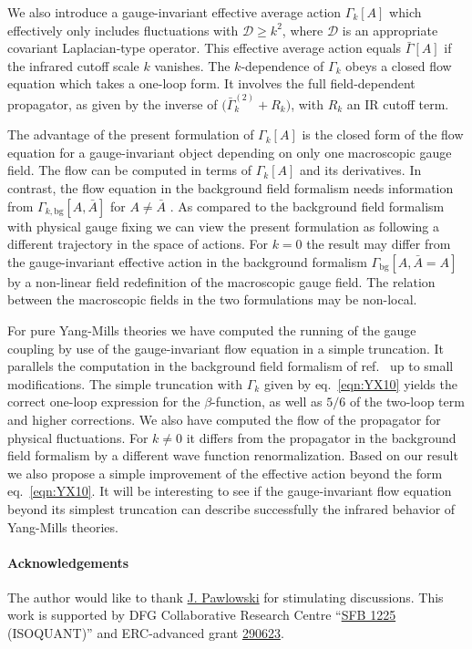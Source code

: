 \documentclass[twocolumn,aps,prd,amsmath,amssymb,preprintnumbers,longbibliography]{revtex4-1}
\numberwithin{equation}{section}
\begin{document}
We also introduce a gauge-invariant effective average action $\Gamma_k[A]$ which effectively only includes fluctuations with $\mathcal{D} \geq k^2$, where $\mathcal{D}$ is an appropriate covariant Laplacian-type operator. This effective average action equals $\bar\Gamma[A]$ if the infrared cutoff scale $k$ vanishes. The $k$-dependence of $\Gamma_k$ obeys a closed flow equation which takes a one-loop form. It involves the full field-dependent propagator, as given by the inverse of $\bigl(\bar\Gamma_k^{(2)} + R_k\bigr)$, with $R_k$ an IR cutoff term. 

The advantage of the present formulation of $\Gamma_k[A]$ is the closed form of the flow equation for a gauge-invariant object depending on only one macroscopic gauge field. The flow can be computed in terms of $\Gamma_k[A]$ and its derivatives. In contrast, the flow equation in the background field formalism needs information from $\Gamma_{k,\text{bg}}[A,\bar{A}]$ for $A \neq \bar{A}$ \cite{RW}. As compared to the background field formalism with physical gauge fixing we can view the present formulation as following a different trajectory in the space of actions. For $k = 0$ the result may differ from the gauge-invariant effective action in the background formalism $\Gamma_\text{bg}[A,\bar{A} = A]$ by a non-linear field redefinition of the macroscopic gauge field. The relation between the macroscopic fields in the two formulations may be non-local.

For pure Yang-Mills theories we have computed the running of the gauge coupling by use of the gauge-invariant flow equation in a simple truncation. It parallels the computation in the background field formalism of ref.~\cite{RW} up to small modifications. The simple truncation with $\Gamma_k$ given by eq.~\eqref{eqn:YX10} yields the correct one-loop expression for the $\beta$-function, as well as $5/6$ of the two-loop term and higher corrections. We also have computed the flow of the propagator for physical fluctuations. For $k \neq 0$ it differs from the propagator in the background field formalism by a different wave function renormalization. Based on our result we also propose a simple improvement of the effective action beyond the form eq.~\eqref{eqn:YX10}. It will be interesting to see if the gauge-invariant flow equation beyond its simplest truncation can describe successfully the infrared behavior of Yang-Mills theories.

\paragraph{Acknowledgements} The author would like to thank \href{mailto:j.pawlowski@thphys.uni-heidelberg.de}{J. Pawlowski} for stimulating discussions. This work is supported by DFG Collaborative Research Centre ``\href{http://www.dfg.de/en/research_funding/programmes/list/projectdetails/index.jsp?id=273811115&sort=var_asc&prg=SFB}{SFB 1225} (ISOQUANT)'' and ERC-advanced grant \href{http://cordis.europa.eu/project/rcn/101262_en.html}{290623}.
\end{document}
